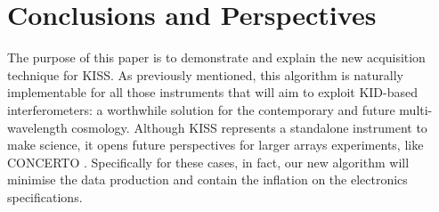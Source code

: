\documentclass[twocolumn,traditabstract]{aa}\\
\begin{document}
\section{Conclusions and Perspectives}
The purpose of this paper is to demonstrate and explain the new acquisition technique for KISS. As previously mentioned, this algorithm is naturally implementable for all those instruments that will aim to exploit KID-based interferometers: a worthwhile solution for the contemporary and future multi-wavelength cosmology. Although KISS represents a standalone instrument to make science, it opens future perspectives for larger arrays experiments, like CONCERTO \cite{concerto}. Specifically for these cases, in fact, our new algorithm will minimise the data production and contain the inflation on the electronics specifications.


\end{document}
